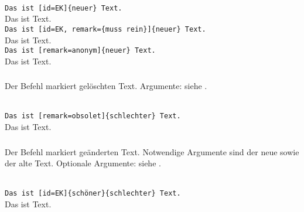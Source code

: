 \begin{chusage}
		\>\\
	\usageexample
		\>\texttt{Das ist [id=EK]\{neuer\} Text.}\\
		\>Das ist  Text.\\
		\>\texttt{Das ist [id=EK, remark=\{muss rein\}]\{neuer\} Text.}\\
		\>Das ist  Text.\\
		\>\texttt{Das ist [remark=anonym]\{neuer\} Text.}\\
		\>Das ist  Text.
\end{chusage}


\subsubsection{}
\DescribeMacro{\deleted}

Der Befehl  markiert gelöschten Text.
Argumente: siehe .

\begin{chusage}
		\>\\
	\usageexample
		\>\texttt{Das ist [remark=obsolet]\{schlechter\} Text.}\\
		\>Das ist  Text.
\end{chusage}


\subsubsection{}
\DescribeMacro{\replaced}

Der Befehl  markiert geänderten Text.
Notwendige Argumente sind der neue sowie der alte Text.
Optionale Argumente: siehe .

\begin{chusage}
		\>\\
	\usageexample
		\>\texttt{Das ist [id=EK]\{schöner\}\{schlechter\} Text.}\\
		\>Das ist  Text.
\end{chusage}


